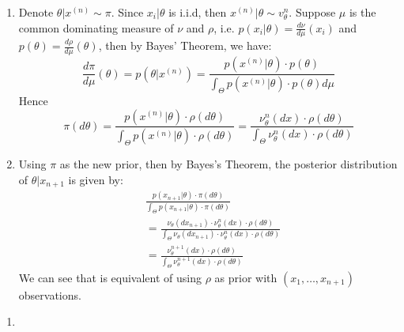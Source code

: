 \documentclass{article}
\begin{document}



\begin{enumerate}
\item 
Denote $\theta | x^{(n)} \sim \pi$. Since $x_i|\theta$ is i.i.d, then $x^{(n)} |\theta \sim v_{\theta}^n$. Suppose $\mu$ is the common dominating measure of $\nu$ and $\rho$, i.e. $p(x_i|\theta) = \frac{d\nu}{d\mu}(x_i)$ and $p(\theta) = \frac{d\rho}{d\mu}(\theta)$, then by Bayes' Theorem, we have:
\[\frac{d\pi}{d\mu}(\theta) = p(\theta | x^{(n)}) = \frac{p(x^{(n)}|\theta) \cdot p(\theta)}{\int_{\Theta} p(x^{(n)}|\theta) \cdot p(\theta) d\mu}\]
Hence\[\pi(d\theta) = \frac{p(x^{(n)}|\theta) \cdot \rho(d\theta)}{\int_{\Theta} p(x^{(n)}|\theta) \cdot \rho(d\theta)} = \frac{\nu_{\theta}^n(dx)\cdot \rho(d\theta)}{\int_{\Theta} \nu_{\theta}^n(dx) \cdot \rho(d\theta)}\]



\item 
Using $\pi$ as the new prior, then by Bayes's Theorem, the posterior distribution of $\theta|x_{n+1}$ is given by:
\begin{align*}
& \frac{p(x_{n+1}|\theta) \cdot \pi(d\theta)}{\int_{\Theta} p(x_{n+1}|\theta) \cdot \pi(d\theta)}\\
& = \frac{\nu_{\theta}(dx_{n+1}) \cdot \nu_{\theta}^n(dx)\cdot \rho(d\theta)}{\int_{\Theta} \nu_{\theta}(dx_{n+1}) \cdot \nu_{\theta}^n(dx)\cdot \rho(d\theta)}\\
& = \frac{\nu_{\theta}^{n+1}(dx) \cdot \rho(d\theta)}{\int_{\Theta} \nu_{\theta}^{n+1}(dx)\cdot \rho(d\theta)}
\end{align*}We can see that is equivalent of using $\rho$ as prior with $(x_1, \ldots, x_{n+1})$ observations.






\end{enumerate}


\begin{enumerate}
\item 
\end{enumerate}










 
\end{document}

